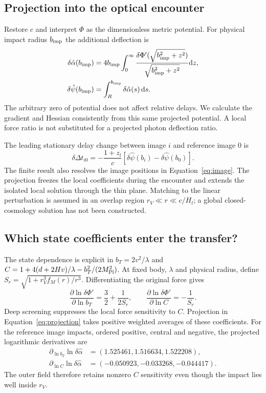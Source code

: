 \subsection{Projection into the optical encounter}
Restore $c$ and interpret $\Phi$ as the dimensionless metric potential.
For physical impact radius $b_{\rm imp}$ the additional deflection is
\begin{align}
 \delta\hat\alpha(b_{\rm imp})&=
 4b_{\rm imp}\int_0^\infty
 \frac{\delta\Phi'(\sqrt{b_{\rm imp}^2+z^2})}
 {\sqrt{b_{\rm imp}^2+z^2}}\mathrm d z,\label{eq:projection}\\
 \delta\hat\psi(b_{\rm imp})&=
 \int_R^{b_{\rm imp}}\delta\hat\alpha(s)\,\mathrm d s .
 \label{eq:potential}
\end{align}
The arbitrary zero of potential does not affect relative delays.
We calculate the gradient and Hessian consistently from this same
projected potential. A local force ratio is not substituted for a
projected photon deflection ratio.

The leading stationary delay change between image $i$ and reference
image $0$ is
\begin{equation}
 \delta\Delta t_{i0}
 =-\frac{1+z_l}{c}
 \left[\delta\hat\psi(b_i)-\delta\hat\psi(b_0)\right].
 \label{eq:delay-prediction}
\end{equation}
The finite result also resolves the image positions in
Equation~\eqref{eq:image}. The projection freezes the local coefficients
during the encounter and extends the isolated local solution through the
thin plane. Matching to the linear perturbation is assumed in an overlap
region $r_V\ll r\ll c/H_l$; a global closed-cosmology solution has not
been constructed.

\subsection{Which state coefficients enter the transfer?}
The state dependence is explicit in $b_T=2v^2/\lambda$ and
$C=1+4(d+2Hv)/\lambda-b_T^2/(2M_{\rm Pl}^2)$. At fixed body,
$\lambda$ and physical radius, define
$S_r=\sqrt{1+r_V^3f_M(r)/r^3}$. Differentiating the original force gives
\begin{equation}
 \frac{\partial\ln\delta\Phi'}{\partial\ln b_T}
 =\frac32+\frac1{2S_r},\qquad
 \frac{\partial\ln\delta\Phi'}{\partial\ln C}=-\frac1{S_r}.
 \label{eq:state-sensitivity}
\end{equation}
Deep screening suppresses the local force sensitivity to $C$. Projection
in Equation~\eqref{eq:projection} takes positive weighted averages of
these coefficients. For the reference image impacts, ordered positive,
central and negative, the projected logarithmic derivatives are
\[
 \begin{aligned}
 \partial_{\ln b_T}\ln\delta\hat\alpha
   &=(1.525461,1.516634,1.522208),\\
 \partial_{\ln C}\ln\delta\hat\alpha
   &=(-0.050923,-0.033268,-0.044417).
 \end{aligned}
\]
The outer field therefore retains nonzero $C$ sensitivity even though
the impact lies well inside $r_V$.

